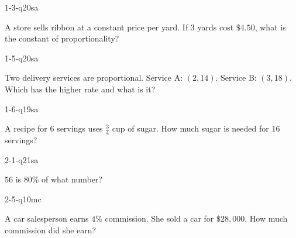 
\begin{practiceQuestion}{1-3-q20}{sa}
\begin{questionText}
A store sells ribbon at a constant price per yard. If $3$ yards cost $\$4.50$, what is the constant of proportionality?
\end{questionText}
\end{practiceQuestion}

\begin{practiceQuestion}{1-5-q20}{sa}
\begin{questionText}
Two delivery services are proportional. Service A: $(2, 14)$. Service B: $(3, 18)$. Which has the higher rate and what is it?
\end{questionText}
\end{practiceQuestion}

\begin{practiceQuestion}{1-6-q19}{sa}
\begin{questionText}
A recipe for $6$ servings uses $\frac{3}{4}$ cup of sugar. How much sugar is needed for $16$ servings?
\end{questionText}
\end{practiceQuestion}

\begin{practiceQuestion}{2-1-q21}{sa}
\begin{questionText}
$56$ is $80\%$ of what number?
\end{questionText}
\end{practiceQuestion}

\begin{practiceQuestion}{2-5-q10}{mc}
\begin{questionText}
A car salesperson earns $4\%$ commission. She sold a car for $\$28{,}000$. How much commission did she earn?
\end{questionText}
\end{practiceQuestion}


